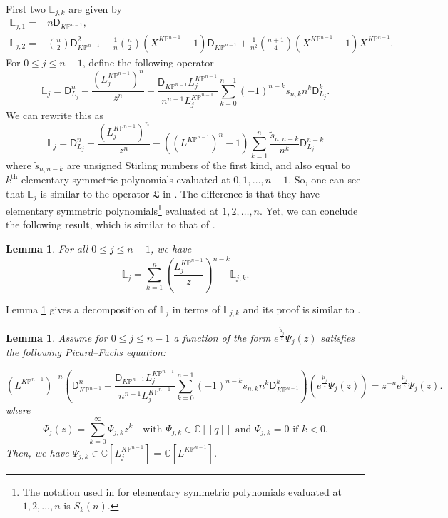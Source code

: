 \documentclass[12pt]{amsart}
\newtheorem{lem}[prop]{Lemma}
\numberwithin{equation}{section}
\newcommand{\KP}{K\mathbb{P}}
\begin{document}
First two $\mathds{L}_{j,k}$ are given by
\begin{equation*}
\begin{split}
\mathds{L}_{j,1}=&n\mathsf{D}_{\KP^{n-1}},\\
\mathds{L}_{j,2}=&\binom{n}{2}\mathsf{D}^2_{\KP^{n-1}}-\frac{1}{n}\binom{n}{2}(X^{\KP^{n-1}}-1)\mathsf{D}_{\KP^{n-1}}+\frac{1}{n^2}\binom{n+1}{4}(X^{\KP^{n-1}}-1)X^{\KP^{n-1}}.
\end{split}
\end{equation*}
For $0\leq j \leq n-1$, define the following operator
\begin{equation*}
\mathds{L}_j={\mathsf{D}}_{L_j}^n-\frac{(L_j^{\KP^{n-1}})^{n}}{z^n}-\frac{{\mathsf{D}}_{\KP^{n-1}}L_j^{\KP^{n-1}}}{n^{n-1}L_j^{\KP^{n-1}}}\sum_{k=0}^{n-1}(-1)^{n-k}{s}_{n,k}n^k{\mathsf{D}}_{L_j}^k.
\end{equation*}
We can rewrite this as
\begin{equation*}
\mathds{L}_j={\mathsf{D}}_{L_j}^n-\frac{(L_j^{\KP^{n-1}})^{n}}{z^n}-\left((L^{\KP^{n-1}})^n-1 \right)\sum_{k=1}^{n}\frac{\widetilde{s}_{n,n-k}}{n^{k}}{\mathsf{D}}_{L_j}^{n-k}
\end{equation*}
where $\widetilde{s}_{n,n-k}$ are unsigned Stirling numbers of the first kind, and also equal to $k^{\text{th}}$ elementary symmetric polynomials evaluated at $0,1,\ldots, n-1$. So, one can see that $\mathds{L}_j$ is similar to the operator $\mathfrak{L}$ in \cite[page 9]{zz}. The difference is that they have elementary symmetric polynomials\footnote{The notation used in \cite{zz} for elementary symmetric polynomials evaluated at $1,2,\ldots, n$ is $S_k(n)$.} evaluated at $1,2,\ldots, n$. Yet, we can conclude the following result, which is similar to that of \cite{zz}. 
\begin{lem}\label{lem:decomposition_of_mathdsLj}
For all $0\leq{j}\leq{n-1}$, we have
\begin{equation*}
\mathds{L}_j=\sum_{k=1}^n\left(\frac{L_j^{\KP^{n-1}}}{z}\right)^{n-k}\mathds{L}_{j,k}.
\end{equation*}
\end{lem}
Lemma \ref{lem:decomposition_of_mathdsLj} gives a decomposition of $\mathds{L}_j$ in terms of $\mathds{L}_{j,k}$ and its proof is similar to \cite[Lemma B.7]{gt}. 
\begin{lem}\label{lem:AymptoticPFSolution}
Assume for $0\leq{j}\leq{n-1}$ a function of the form $e^{\frac{\widetilde{\mu}_{j}}{z}}\Psi_{j}(z)$ satisfies the following Picard--Fuchs equation:

\begin{equation*}
(L^{\KP^{n-1}})^{-n}\left(\mathsf{D}_{\KP^{n-1}}^n-\frac{{\mathsf{D}}_{\KP^{n-1}}L_j^{\KP^{n-1}}}{n^{n-1}L_j^{\KP^{n-1}}}\sum_{k=0}^{n-1}(-1)^{n-k}{s}_{n,k}n^k\mathsf{D}_{\KP^{n-1}}^k\right)\left(e^{\frac{\widetilde{\mu}_{j}}{z}}\Psi_{j}(z)\right)=z^{-n}e^{\frac{\widetilde{\mu}_{j}}{z}}\Psi_{j}(z).
\end{equation*}
where
\begin{equation*}
\Psi_{j}(z)=\sum_{k=0}^{\infty} \Psi_{j,k} z^{k}\quad\text{with } \Psi_{j,k}\in\mathbb{C}[\![q]\!]\text{ and }\Psi_{j,k}=0\text{ if } k<0.
\end{equation*}
Then, we have $\Psi_{j,k}\in\mathbb{C}[L_j^{\KP^{n-1}}]=\mathbb{C}[L^{\KP^{n-1}}]$.
\end{lem}
\end{document}
